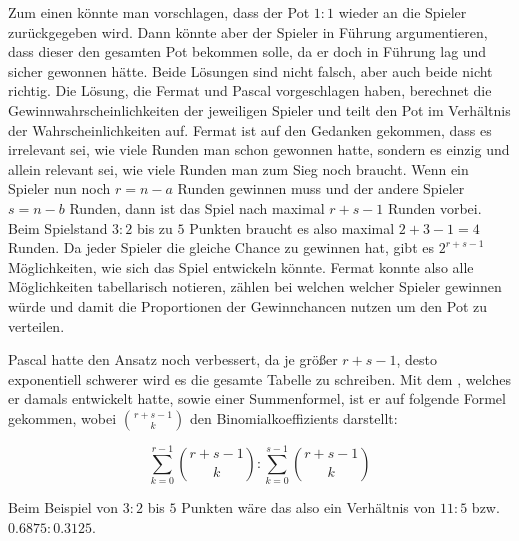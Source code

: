 Zum einen könnte man vorschlagen, dass der Pot $1:1$ wieder an die Spieler zurückgegeben wird. Dann könnte aber der Spieler in Führung argumentieren, dass dieser den gesamten Pot bekommen solle, da er doch in Führung lag und sicher gewonnen hätte. Beide Lösungen sind nicht falsch, aber auch beide nicht richtig. Die Lösung, die Fermat und Pascal vorgeschlagen haben, berechnet die Gewinnwahrscheinlichkeiten der jeweiligen Spieler und teilt den Pot im Verhältnis der Wahrscheinlichkeiten auf. Fermat ist auf den Gedanken gekommen, dass es irrelevant sei, wie viele Runden man schon gewonnen hatte, sondern es einzig und allein relevant sei, wie viele Runden man zum Sieg noch braucht. Wenn ein Spieler nun noch $r=n-a$ Runden gewinnen muss und der andere Spieler $s=n-b$ Runden, dann ist das Spiel nach maximal $r+s-1$ Runden vorbei. Beim Spielstand $3:2$ bis zu $5$ Punkten braucht es also maximal $2+3-1=4$ Runden. Da jeder Spieler die gleiche Chance zu gewinnen hat, gibt es $2^{r+s-1}$ Möglichkeiten, wie sich das Spiel entwickeln könnte. Fermat konnte also alle Möglichkeiten tabellarisch notieren, zählen bei welchen welcher Spieler gewinnen würde und damit die Proportionen der Gewinnchancen nutzen um den Pot zu verteilen.

Pascal hatte den Ansatz noch verbessert, da je größer $r+s-1$, desto exponentiell schwerer wird es die gesamte Tabelle zu schreiben. Mit dem , welches er damals entwickelt hatte, sowie einer Summenformel, ist er auf folgende Formel gekommen, wobei $\binom{r+s-1}{k}$ den \Glspl{Binomialkoeffizient} darstellt:

\[ \sum^{r-1}_{k=0} \binom{r+s-1}{k} : \sum^{s-1}_{k=0} \binom{r+s-1}{k} \]

Beim Beispiel von $3:2$ bis $5$ Punkten wäre das also ein Verhältnis von $11:5$ bzw. $0.6875:0.3125$.